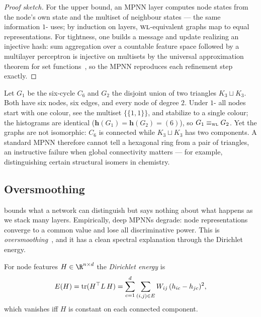 \begin{proof}[Proof sketch]
For the upper bound, an MPNN layer computes node states from the node's own state
and the multiset of neighbour states --- the same information $1$-\WL{} uses; by
induction on layers, $\textsc{wl}$-equivalent graphs map to equal representations. For
tightness, one builds a message and update realizing an injective hash: sum
aggregation over a countable feature space followed by a multilayer perceptron is
injective on multisets by the universal approximation theorem for set
functions~\citep{zaheer2017deepsets}, so the MPNN reproduces each refinement step
exactly.
\end{proof}

\begin{example}
\label{ex:graphs:wl-fail}
Let $G_1$ be the six-cycle $C_6$ and $G_2$ the disjoint union of two triangles
$K_3 \sqcup K_3$. Both have six nodes, six edges, and every node of degree $2$.
Under $1$-\WL{} all nodes start with one colour, see the multiset
$\{\!\{1,1\}\!\}$, and stabilize to a single colour; the histograms are identical
($\mathbf{h}(G_1) = \mathbf{h}(G_2) = (6)$), so $G_1 \equiv_{\textsc{wl}} G_2$. Yet the
graphs are not isomorphic: $C_6$ is connected while $K_3 \sqcup K_3$ has two
components. A standard MPNN therefore cannot tell a hexagonal ring from a pair of
triangles, an instructive failure when global connectivity matters --- for
example, distinguishing certain structural isomers in chemistry.
\end{example}

\subsection{Oversmoothing}
\label{sec:graphs:oversmoothing}

 bounds what a network can distinguish but says nothing
about what happens as we stack many layers. Empirically, deep MPNNs degrade: node
representations converge to a common value and lose all discriminative power.
This is \emph{oversmoothing}~\citep{li2018deeper}, and it has a clean spectral
explanation through the Dirichlet energy.

\begin{definition}
\label{def:graphs:dirichlet}
For node features $H \in \R^{n \times d}$ the \emph{Dirichlet energy} is
\[
  E(H) = \operatorname{tr}(H^\top L\, H)
       = \sum_{c=1}^d \sum_{(i,j) \in E} W_{ij}\,(h_{ic} - h_{jc})^2 ,
\]
which vanishes iff $H$ is constant on each connected component.
\end{definition}

